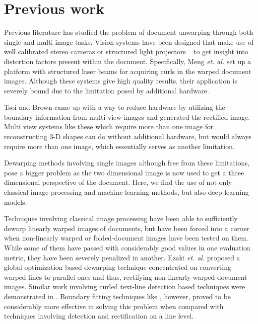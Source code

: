 \documentclass[a4paper,conference]{IEEEtran}
\begin{document}
	
	
	\section{Previous work}
	
	Previous literature has studied the problem of document unwarping through both single and multi image tasks. Vision systems have been designed that make use of well calibrated stereo cameras or structured light projectors ~\cite{1334171,Ulges,937649,meng2014active} to get insight into distortion factors present within the document. Specifically, Meng \textit{et. al.}\cite{meng2014active} set up a platform with structured laser beams for acquiring curls in the warped document images. Although these systems give high quality results, their application is severely bound due to the limitation posed by additional hardware.
	
	
	Tsoi and Brown \cite{tsoi2007multi} came up with a way to  reduce hardware by utilizing the boundary information from multi-view images and generated the rectified image. Multi view systems like these which require more than one image for reconstructing 3-D shapes can do without additional hardware, but would always require more than one image, which essentially serves as another limitation.
	
	
	
	Dewarping methods involving single images although free from these limitations, pose a bigger problem as the two dimensional image is now used to get a three dimensional perspective of the document. Here, we find the use of not only classical image processing and machine learning methods, but also deep learning models.
	
	
	Techniques involving classical image processing have been able to sufficiently dewarp linearly warped images of documents\cite{wu2002document, lu2006document, mollah2009fast}, but have been forced into a corner when non-linearly warped or folded-document images have been tested on them\cite{shafait2007document}. While some of them have passed with considerably good values in one evaluation metric, they have been severely penalized in another. Ezaki \textit{et. al.} \cite{ezaki2005dewarping} proposed a global optimization based dewarping technique concentrated on converting warped lines to parallel ones and thus, rectifying non-linearly warped document images. Similar work involving curled text-line detection based techniques were demonstrated in \cite{ulges2005document, kakumanu2006document}. Boundary fitting techniques like \cite{wu2007model, wu2008model, masalovitch2007usage, he2013book, huggett2013method, bolelli2017indexing} , however, proved to be considerably more effective in solving this problem when compared with techniques involving detection and rectification on a line level.
	
\end{document}
